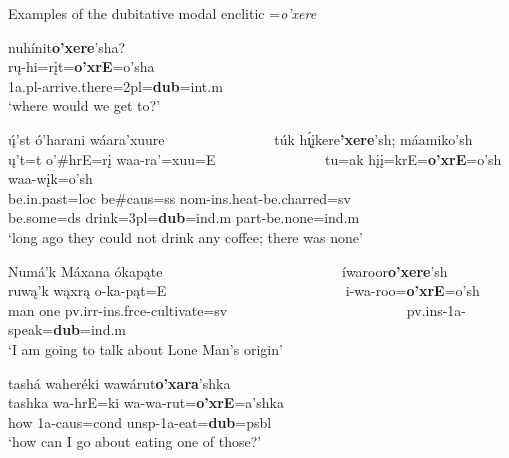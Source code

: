 \begin{exe}

\item\label{dubitativeenclitic} Examples of the dubitative modal enclitic =\textit{o'xere}

	\begin{xlist}
	
	\item\label{dubitativeenclitic1}
	\glll nuhínit\textbf{o'xere}'sha?\\
	rų-hi=rįt=\textbf{o'xrE}=o'sha\\
	1a.pl-\textnormal{arrive.there}=2pl=\textbf{dub}=int.m\\
	\glt `where would we get to?' \citep[19]{kennard1936}

	\item\label{dubitativeenclitic2}
	\glll ų́'st ó'harani wáara'xuure ~ ~ ~ ~ ~ ~ ~ ~ ~ túk h\'{ı̨}įkere\textbf{'xere}'sh; máamiko'sh\\
	ų't=t o'\#hrE=rį waa-ra'=xuu=E ~ ~ ~ ~ ~ ~ ~ ~ ~  tu=ak hįį=krE=\textbf{o'xrE}=o'sh waa-wįk=o'sh\\
	\textnormal{be.in.past}=loc \textnormal{be}\#caus=ss nom-ins.heat-\textnormal{be.charred}=sv ~ ~ ~ ~ ~ ~ ~ ~ ~  \textnormal{be.some}=ds \textnormal{drink}=3pl=\textbf{dub}=ind.m part-\textnormal{be.none}=ind.m\\
	\glt `long ago they could not drink any coffee; there was none' \citep[204]{hollow1973a}

	\item\label{dubitativeenclitic3}
	\glll Numá'k Máxana ókapąte ~ ~ ~ ~ ~ ~ ~ ~ ~ ~ ~ ~ ~ ~ ~  íwaroor\textbf{o'xere}'sh\\
	ruwą'k wąxrą o-ka-pąt=E ~ ~ ~ ~ ~ ~ ~ ~ ~ ~ ~ ~ ~ ~ ~  i-wa-roo=\textbf{o'xrE}=o'sh\\
	\textnormal{man} \textnormal{one} pv.irr-ins.frce-\textnormal{cultivate}=sv ~ ~ ~ ~ ~ ~ ~ ~ ~ ~ ~ ~ ~ ~ ~ pv.ins-1a-\textnormal{speak}=\textbf{dub}=ind.m\\
	\glt `I am going to talk about Lone Man's origin' \citep[5]{hollow1973a}

	\item\label{dubitativeenclitic4}
	\glll tashá waheréki wawárut\textbf{o'xara}'shka\\
	tashka wa-hrE=ki wa-wa-rut=\textbf{o'xrE}=a'shka\\
	\textnormal{how} 1a-caus=cond unsp-1a-\textnormal{eat}=\textbf{dub}=psbl\\
	\glt `how can I go about eating one of those?' \citep[32]{hollow1973b}


\end{xlist}
\end{exe}

